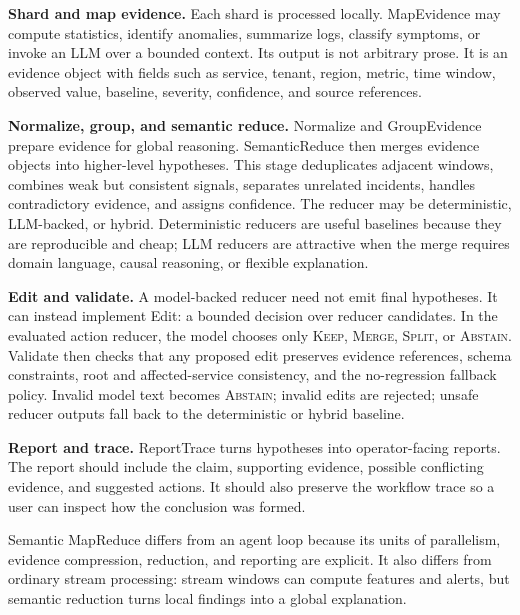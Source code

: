 \documentclass[sigplan,anonymous,nonacm]{acmart}
\newcommand{\systemname}{Semantic MapReduce}
\begin{document}
\textbf{Shard and map evidence.} Each shard is processed locally. \textsf{MapEvidence} may compute statistics, identify anomalies, summarize logs, classify symptoms, or invoke an LLM over a bounded context. Its output is not arbitrary prose. It is an evidence object with fields such as service, tenant, region, metric, time window, observed value, baseline, severity, confidence, and source references.

\textbf{Normalize, group, and semantic reduce.} \textsf{Normalize} and \textsf{GroupEvidence} prepare evidence for global reasoning. \textsf{SemanticReduce} then merges evidence objects into higher-level hypotheses. This stage deduplicates adjacent windows, combines weak but consistent signals, separates unrelated incidents, handles contradictory evidence, and assigns confidence. The reducer may be deterministic, LLM-backed, or hybrid. Deterministic reducers are useful baselines because they are reproducible and cheap; LLM reducers are attractive when the merge requires domain language, causal reasoning, or flexible explanation.

\textbf{Edit and validate.} A model-backed reducer need not emit final hypotheses. It can instead implement \textsf{Edit}: a bounded decision over reducer candidates. In the evaluated action reducer, the model chooses only \textsc{Keep}, \textsc{Merge}, \textsc{Split}, or \textsc{Abstain}. \textsf{Validate} then checks that any proposed edit preserves evidence references, schema constraints, root and affected-service consistency, and the no-regression fallback policy. Invalid model text becomes \textsc{Abstain}; invalid edits are rejected; unsafe reducer outputs fall back to the deterministic or hybrid baseline.

\textbf{Report and trace.} \textsf{ReportTrace} turns hypotheses into operator-facing reports. The report should include the claim, supporting evidence, possible conflicting evidence, and suggested actions. It should also preserve the workflow trace so a user can inspect how the conclusion was formed.

\systemname{} differs from an agent loop because its units of parallelism, evidence compression, reduction, and reporting are explicit. It also differs from ordinary stream processing: stream windows can compute features and alerts, but semantic reduction turns local findings into a global explanation.
\end{document}
